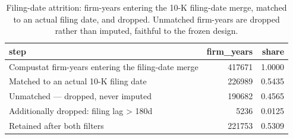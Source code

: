 \begin{table}[htbp]
\centering
\caption{Filing-date attrition: firm-years entering the 10-K filing-date merge, matched to an actual filing date, and dropped. Unmatched firm-years are dropped rather than imputed, faithful to the frozen design.}
\label{tab:filing_date_selection_overview}
\small
\begin{tabular}{lrr}
\toprule
step & firm\_years & share \\
\midrule
Compustat firm-years entering the filing-date merge & 417671 & 1.0000 \\
Matched to an actual 10-K filing date & 226989 & 0.5435 \\
Unmatched — dropped, never imputed & 190682 & 0.4565 \\
Additionally dropped: filing lag > 180d & 5236 & 0.0125 \\
Retained after both filters & 221753 & 0.5309 \\
\bottomrule
\end{tabular}
\end{table}
